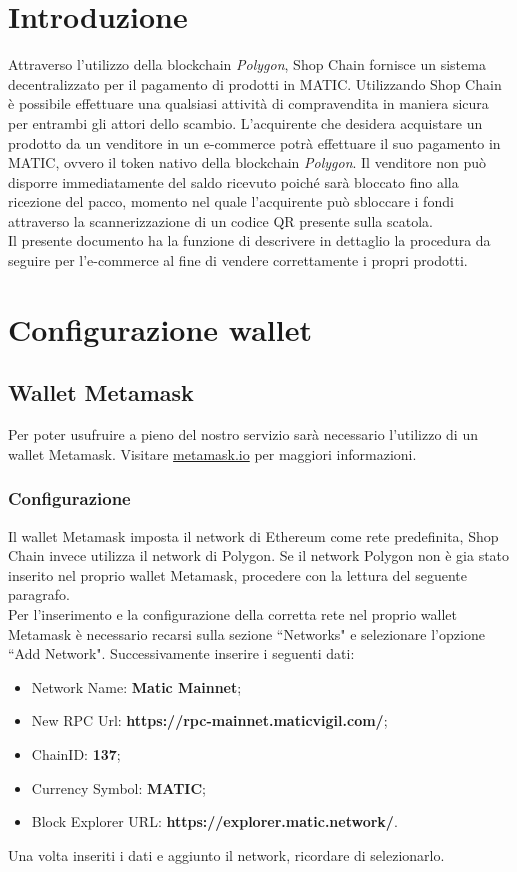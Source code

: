 \documentclass[a4paper, 12pt]{article}
\begin{document}
\makefrontpage
\makeversioni
\tableofcontents
\newpage

\section{Introduzione}
Attraverso l'utilizzo della blockchain \textit{Polygon}, Shop Chain fornisce un sistema decentralizzato per il pagamento di prodotti in MATIC. Utilizzando Shop Chain è possibile effettuare una qualsiasi attività di compravendita in maniera sicura per entrambi gli attori dello scambio. L'acquirente che desidera acquistare un prodotto da un venditore in un e-commerce potrà effettuare il suo pagamento in MATIC, ovvero il token nativo della blockchain \textit{Polygon}. Il venditore non può disporre immediatamente del saldo ricevuto poiché sarà bloccato fino alla ricezione del pacco, momento nel quale l'acquirente può sbloccare i fondi attraverso la scannerizzazione di un codice QR presente sulla scatola.
\\Il presente documento ha la funzione di descrivere in dettaglio la procedura da seguire per l'e-commerce al fine di vendere correttamente i propri prodotti.

\newpage
\section{Configurazione wallet}
\subsection{Wallet Metamask}
Per poter usufruire a pieno del nostro servizio sarà necessario l'utilizzo di un wallet Metamask. Visitare \href{https://www.metamask.io}{metamask.io} per maggiori informazioni.
\subsubsection{Configurazione}
Il wallet Metamask imposta il network di Ethereum come rete predefinita, Shop Chain invece utilizza il network di Polygon. Se il network Polygon non è gia stato inserito nel proprio wallet Metamask, procedere con la lettura del seguente paragrafo.
\\Per l'inserimento e la configurazione della corretta rete nel proprio wallet Metamask è necessario recarsi sulla sezione ``Networks" e selezionare l'opzione ``Add Network". Successivamente inserire i seguenti dati:
\begin{itemize}
\item Network Name: \textbf{Matic Mainnet};
\item New RPC Url: \textbf{https://rpc-mainnet.maticvigil.com/};
\item ChainID: \textbf{137};
\item Currency Symbol: \textbf{MATIC};
\item Block Explorer URL: \textbf{https://explorer.matic.network/}.
\end{itemize}
Una volta inseriti i dati e aggiunto il network, ricordare di selezionarlo.
\end{document}
